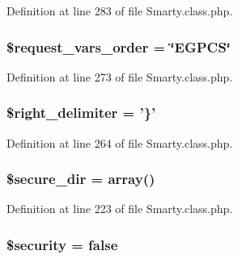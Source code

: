 \-Definition at line 283 of file \-Smarty.\-class.\-php.

\hypertarget{class_smarty_a03919f6e9cba8f50093023e78b0fc6aa}{
\subsubsection[{\$request\-\_\-vars\-\_\-order}]{\setlength{\rightskip}{0pt plus 5cm}\$request\-\_\-vars\-\_\-order = \char`\"{}\-E\-G\-P\-C\-S\char`\"{}}}\label{class_smarty_a03919f6e9cba8f50093023e78b0fc6aa}


\-Definition at line 273 of file \-Smarty.\-class.\-php.

\hypertarget{class_smarty_ad3fe9ebfa998625e29836badfe1840bd}{
\subsubsection[{\$right\-\_\-delimiter}]{\setlength{\rightskip}{0pt plus 5cm}\$right\-\_\-delimiter = '\}'}}\label{class_smarty_ad3fe9ebfa998625e29836badfe1840bd}


\-Definition at line 264 of file \-Smarty.\-class.\-php.

\hypertarget{class_smarty_a7694029b12fccde3ffae27a1d1d7b5be}{
\subsubsection[{\$secure\-\_\-dir}]{\setlength{\rightskip}{0pt plus 5cm}\$secure\-\_\-dir = array()}}\label{class_smarty_a7694029b12fccde3ffae27a1d1d7b5be}


\-Definition at line 223 of file \-Smarty.\-class.\-php.

\hypertarget{class_smarty_a7ef3408af92597c92305e22f79e67d61}{
\subsubsection[{\$security}]{\setlength{\rightskip}{0pt plus 5cm}\$security = false}}\label{class_smarty_a7ef3408af92597c92305e22f79e67d61}


